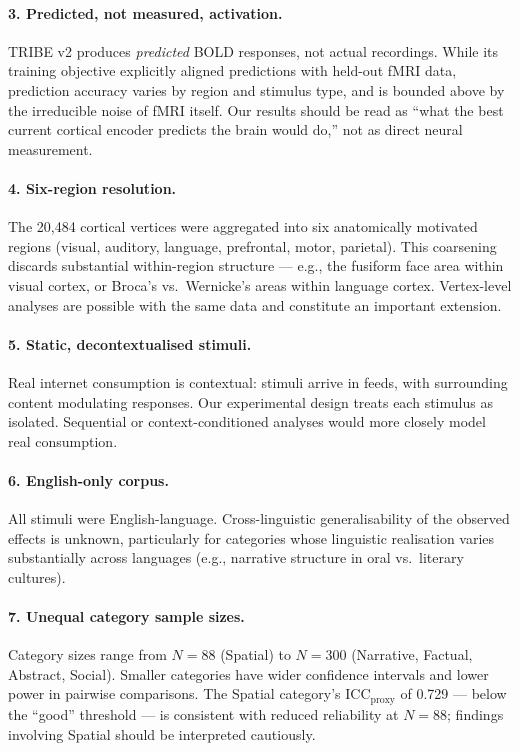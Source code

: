 \documentclass[11pt,letterpaper]{article}
\begin{document}
\paragraph{3. Predicted, not measured, activation.} TRIBE v2 produces \textit{predicted} BOLD responses, not actual recordings. While its training objective explicitly aligned predictions with held-out fMRI data, prediction accuracy varies by region and stimulus type, and is bounded above by the irreducible noise of fMRI itself. Our results should be read as ``what the best current cortical encoder predicts the brain would do,'' not as direct neural measurement.

\paragraph{4. Six-region resolution.} The 20{,}484 cortical vertices were aggregated into six anatomically motivated regions (visual, auditory, language, prefrontal, motor, parietal). This coarsening discards substantial within-region structure --- e.g., the fusiform face area within visual cortex, or Broca's vs.\ Wernicke's areas within language cortex. Vertex-level analyses are possible with the same data and constitute an important extension.

\paragraph{5. Static, decontextualised stimuli.} Real internet consumption is contextual: stimuli arrive in feeds, with surrounding content modulating responses. Our experimental design treats each stimulus as isolated. Sequential or context-conditioned analyses would more closely model real consumption.

\paragraph{6. English-only corpus.} All stimuli were English-language. Cross-linguistic generalisability of the observed effects is unknown, particularly for categories whose linguistic realisation varies substantially across languages (e.g., narrative structure in oral vs.\ literary cultures).

\paragraph{7. Unequal category sample sizes.} Category sizes range from $N=88$ (Spatial) to $N=300$ (Narrative, Factual, Abstract, Social). Smaller categories have wider confidence intervals and lower power in pairwise comparisons. The Spatial category's ICC$_{\text{proxy}}$ of 0.729 --- below the ``good'' threshold --- is consistent with reduced reliability at $N=88$; findings involving Spatial should be interpreted cautiously.
\end{document}
